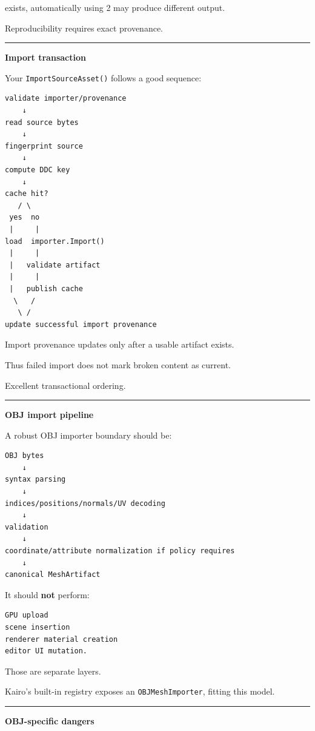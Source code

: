 exists, automatically using 2 may produce different output.

Reproducibility requires exact provenance.

\begin{center}\rule{0.5\linewidth}{0.5pt}\end{center}

\textbf{Import transaction}

Your \texttt{ImportSourceAsset()} follows a good sequence:

\begin{verbatim}
validate importer/provenance
    ↓
read source bytes
    ↓
fingerprint source
    ↓
compute DDC key
    ↓
cache hit?
   / \
 yes  no
 |     |
load  importer.Import()
 |     |
 |   validate artifact
 |     |
 |   publish cache
  \   /
   \ /
update successful import provenance
\end{verbatim}

Import provenance updates only after a usable artifact exists.

Thus failed import does not mark broken content as current.

Excellent transactional ordering.

\begin{center}\rule{0.5\linewidth}{0.5pt}\end{center}

\textbf{OBJ import pipeline}

A robust OBJ importer boundary should be:

\begin{verbatim}
OBJ bytes
    ↓
syntax parsing
    ↓
indices/positions/normals/UV decoding
    ↓
validation
    ↓
coordinate/attribute normalization if policy requires
    ↓
canonical MeshArtifact
\end{verbatim}

It should \textbf{not} perform:

\begin{verbatim}
GPU upload
scene insertion
renderer material creation
editor UI mutation.
\end{verbatim}

Those are separate layers.

Kairo's built-in registry exposes an \texttt{OBJMeshImporter}, fitting this model.

\begin{center}\rule{0.5\linewidth}{0.5pt}\end{center}

\textbf{OBJ-specific dangers}

